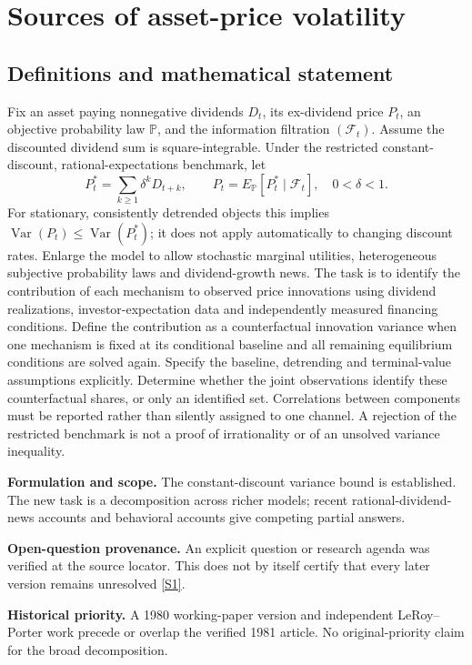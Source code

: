\documentclass[11pt]{article}
\newcommand{\sref}[2]{\hyperlink{source:#1:#2}{[S#2]}}
\begin{document}
\section*{Sources of asset-price volatility}\label{30007593}
\subsection{Definitions and mathematical statement}
Fix an asset paying nonnegative dividends \(D_t\), its ex-dividend price \(P_t\), an objective probability law \(\mathbb P\), and the information filtration \((\mathcal F_t)\). Assume the discounted dividend sum is square-integrable. Under the restricted constant-discount, rational-expectations benchmark, let
\[P_t^*=\sum_{k\geq1}\delta^kD_{t+k},\qquad P_t=E_{\mathbb P}[P_t^*\mid\mathcal F_t],\quad0<\delta<1.\]
For stationary, consistently detrended objects this implies \(\operatorname{Var}(P_t)\leq\operatorname{Var}(P_t^*)\); it does not apply automatically to changing discount rates. Enlarge the model to allow stochastic marginal utilities, heterogeneous subjective probability laws and dividend-growth news. The task is to identify the contribution of each mechanism to observed price innovations using dividend realizations, investor-expectation data and independently measured financing conditions. Define the contribution as a counterfactual innovation variance when one mechanism is fixed at its conditional baseline and all remaining equilibrium conditions are solved again. Specify the baseline, detrending and terminal-value assumptions explicitly. Determine whether the joint observations identify these counterfactual shares, or only an identified set. Correlations between components must be reported rather than silently assigned to one channel. A rejection of the restricted benchmark is not a proof of irrationality or of an unsolved variance inequality.

\par\textbf{Formulation and scope.} The constant-discount variance bound is established. The new task is a decomposition across richer models; recent rational-dividend-news accounts and behavioral accounts give competing partial answers.

\par\textbf{Open-question provenance.} An explicit question or research agenda was verified at the source locator. This does not by itself certify that every later version remains unresolved \sref{30007593}{1}.

\par\textbf{Historical priority.} A 1980 working-paper version and independent LeRoy–Porter work precede or overlap the verified 1981 article. No original-priority claim for the broad decomposition.
\end{document}

